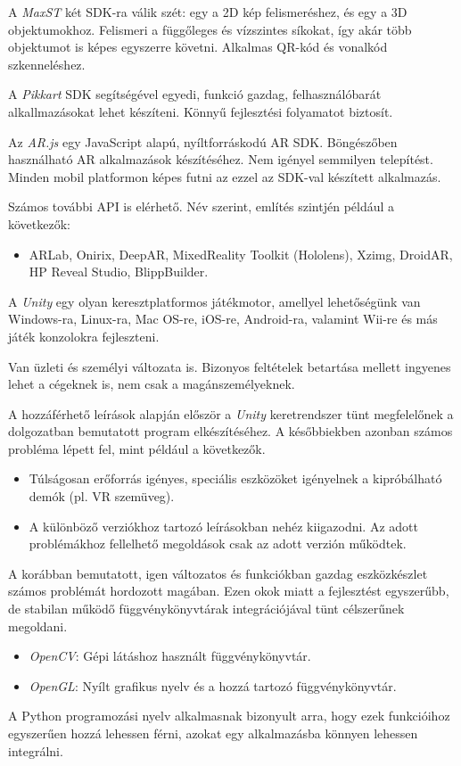 
A \textit{MaxST} két SDK-ra válik szét: egy a 2D kép felismeréshez, és egy a 3D objektumokhoz.
Felismeri a függőleges és vízszintes síkokat, így akár több objektumot is képes egyszerre követni. Alkalmas QR-kód és vonalkód szkenneléshez.


A \textit{Pikkart} SDK segítségével egyedi, funkció gazdag, felhasználóbarát alkallmazásokat lehet készíteni. Könnyű fejlesztési folyamatot biztosít.


Az \textit{AR.js} egy JavaScript alapú, nyíltforráskodú AR SDK. Böngészőben használható AR alkalmazások készítéséhez. Nem igényel semmilyen telepítést. Minden mobil platformon képes futni az ezzel az SDK-val készített alkalmazás.


Számos további API is elérhető. Név szerint, említés szintjén például a következők:
\begin{itemize}
\item ARLab,
Onirix,
DeepAR,
MixedReality Toolkit (Hololens),
Xzimg,
DroidAR,
HP Reveal Studio,
BlippBuilder.
\end{itemize}


A \textit{Unity} egy  olyan keresztplatformos játékmotor, amellyel lehetőségünk van Windows-ra, Linux-ra, Mac OS-re, iOS-re, Android-ra, valamint Wii-re és más játék konzolokra fejleszteni.

Van üzleti és személyi változata is. Bizonyos feltételek betartása mellett ingyenes lehet a cégeknek is, nem csak a magánszemélyeknek.

A hozzáférhető leírások alapján először a \textit{Unity} keretrendszer tünt megfelelőnek a dolgozatban bemutatott program elkészítéséhez.
A későbbiekben azonban számos probléma lépett fel, mint például a következők.
\begin{itemize}
	\item Túlságosan erőforrás igényes, speciális eszközöket igényelnek a kipróbálható demók (pl. VR szemüveg).
	\item A különböző verziókhoz tartozó leírásokban nehéz kiigazodni. Az adott problémákhoz fellelhető megoldások csak az adott verzión működtek.
\end{itemize}


A korábban bemutatott, igen változatos és funkciókban gazdag eszközkészlet számos problémát hordozott magában.
Ezen okok miatt a fejlesztést egyszerűbb, de stabilan működő függvénykönyvtárak integrációjával tünt célszerűnek megoldani.
\begin{itemize}
	\item \textit{OpenCV}: Gépi látáshoz használt függvénykönyvtár.
	\item \textit{OpenGL}: Nyílt grafikus nyelv és a hozzá tartozó függvénykönyvtár.
\end{itemize}
A Python programozási nyelv alkalmasnak bizonyult arra, hogy ezek funkcióihoz egyszerűen hozzá lehessen férni, azokat egy alkalmazásba könnyen lehessen integrálni.
